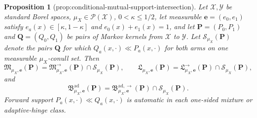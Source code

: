 \documentclass{article}
\newtheorem{proposition}{Proposition}
\begin{document}
\begin{proposition}[prop:conditional-mutual-support-intersection]\label{prop:conditional-mutual-support-intersection}
Let \(\mathcal X,\mathcal Y\) be standard Borel spaces, \(\mu_X\in\mathcal P(\mathcal X)\), \(0<\kappa\le1/2\), let measurable \(\boldsymbol e=(e_0,e_1)\) satisfy \(e_a(x)\in[\kappa,1-\kappa]\) and \(e_0(x)+e_1(x)=1\), and let \(\boldsymbol P=(P_0,P_1)\) and \(\boldsymbol Q=(Q_0,Q_1)\) be pairs of Markov kernels from \(\mathcal X\) to \(\mathcal Y\).  Let \(\mathcal S_{\mu_X}(\boldsymbol P)\) denote the pairs \(\boldsymbol Q\) for which \(Q_a(x,\cdot)\ll P_a(x,\cdot)\) for both arms on one measurable \(\mu_X\)-conull set.  Then
\[
 \mathfrak M_{\mu_X,\boldsymbol e}(\boldsymbol P)=\mathfrak M^{\to}_{\mu_X,\boldsymbol e}(\boldsymbol P)\cap\mathcal S_{\mu_X}(\boldsymbol P),\qquad
 \mathfrak L_{\mu_X,\boldsymbol e}(\boldsymbol P)=\mathfrak L^{\to}_{\mu_X,\boldsymbol e}(\boldsymbol P)\cap\mathcal S_{\mu_X}(\boldsymbol P),
\]
and
\[
 \mathfrak B^{\mathrm{ad}}_{\mu_X,\boldsymbol e}(\boldsymbol P)=\mathfrak B^{\mathrm{ad},\to}_{\mu_X,\boldsymbol e}(\boldsymbol P)\cap\mathcal S_{\mu_X}(\boldsymbol P).
\]
Forward support \(P_a(x,\cdot)\ll Q_a(x,\cdot)\) is automatic in each one-sided mixture or adaptive-hinge class.
\end{proposition}
\end{document}
